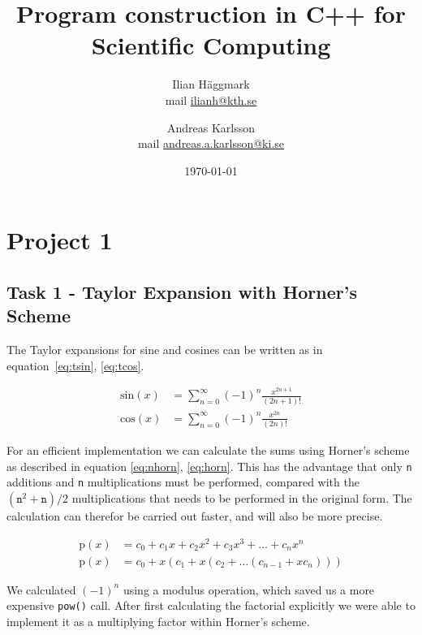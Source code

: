 \documentclass[paper=a4, fontsize=11pt]{article} %
\title{Program construction in C++ for Scientific Computing}
\author{Ilian H{\"a}ggmark \\ mail \href{mailto:ilianh@kth.se}{ilianh@kth.se}
  \and Andreas Karlsson \\ mail \href{mailto:andreas.a.karlsson@ki.se}{andreas.a.karlsson@ki.se} }
\date{\normalsize\today} %
\begin{document}
\maketitle %

\section{Project 1}
\subsection{Task 1 - Taylor Expansion with Horner's Scheme}

The Taylor expansions for sine and cosines can be written as in
equation~\ref{eq:tsin}, \ref{eq:tcos}.

\begin{align}
  \text{sin}(x) &= \sum\limits_{n=0}^\infty{(-1)^{n}\frac{x^{2n+1}}{(2n+1)!}} \label{eq:tsin}\\
  \text{cos}(x) &= \sum\limits_{n=0}^\infty{(-1)^{n}\frac{x^{2n}}{(2n)!}} \label{eq:tcos}
\end{align}

\noindent
For an efficient implementation we can calculate the sums using
Horner's scheme as described in equation \ref{eq:nhorn},
\ref{eq:horn}. This has the advantage that only \texttt{n} additions
and \texttt{n} multiplications must be performed, compared with the
$(\mathtt{n}^{2} + \mathtt{n}) / 2$ multiplications that needs to be performed in the
original form. The calculation can therefor be carried out faster, and
will also be more precise.

\begin{align}
  \text{p}(x) &= c_{0} + c_{1}x + c_{2}x^{2} + c_{3}x^{3} +\dots+c_{n}x^{n} \label{eq:nhorn}\\
  \text{p}(x) &= c_{0} + x(c_{1} + x(c_{2} + \dots (c_{n-1} + xc_{n}))) \label{eq:horn}
\end{align}

\noindent
We calculated $(-1)^n$ using a modulus operation, which saved us a
more expensive \lstinline$pow()$ call. After first calculating the
factorial explicitly we were able to implement it as a multiplying
factor within Horner's scheme.
\end{document}
